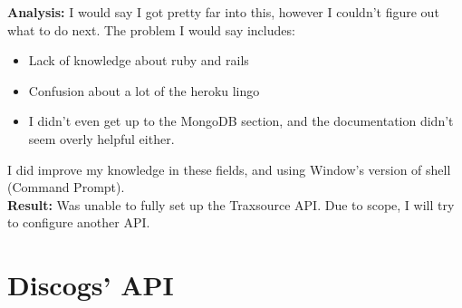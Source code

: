 \documentclass{article}
\begin{document}
\textbf{Analysis:} I would say I got pretty far into this, however I couldn't figure out what to do next. The problem I would say includes:
\begin{itemize}
    \item Lack of knowledge about ruby and rails
    \item Confusion about a lot of the heroku lingo
    \item I didn't even get up to the MongoDB section, and the documentation didn't seem overly helpful either.
\end{itemize}
I did improve my knowledge in these fields, and using Window's version of shell (Command Prompt).\\
\textbf{Result:} Was unable to fully set up the Traxsource API. Due to scope, I will try to configure another API.
\section{Discogs' API}
\end{document}
